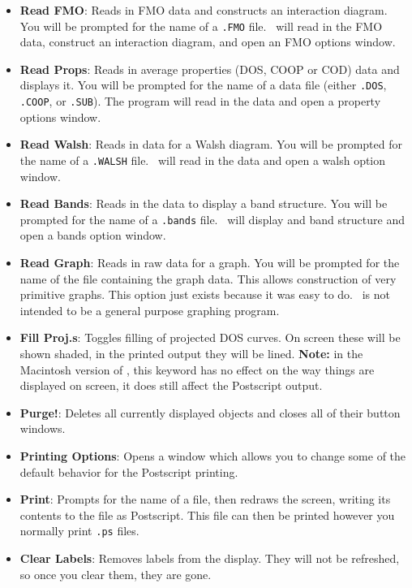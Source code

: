 \begin{itemize}
\item {\bf Read FMO}:  Reads in FMO data and constructs an interaction
diagram.  You will be prompted for the name of a {\tt .FMO} file.
\viewprog\ will read in the FMO data, construct an interaction
diagram, and open an FMO options window.

\item {\bf Read Props}:  Reads in average properties (DOS, COOP or
COD) data and displays it.  You will be prompted for the name of a
data file (either {\tt .DOS}, {\tt .COOP}, or {\tt .SUB}).  The
program will read in the data and open a property options window.

\item {\bf Read Walsh}:  Reads in data for a Walsh diagram.  You will
be prompted for the name of a {\tt .WALSH} file.  \viewprog\ will read
in the data and open a walsh option window.

\item {\bf Read Bands}:  Reads in the data to display a band
structure.  You will be prompted for the name of a {\tt .bands} file.
\viewprog\ will display and band structure and open a bands option
window.


\item {\bf Read Graph}:  Reads in raw data for a graph.  You will be
prompted for the name of the file containing the graph data.  This
allows construction of very primitive graphs.  This option just exists
because it was easy to do.  \viewprog\ is not intended to be a general
purpose graphing program.

\item {\bf Fill Proj.s}:  Toggles filling of projected DOS curves.  On
screen these will be shown shaded, in the printed output they will be
lined.  {\bf Note:} in the Macintosh version of \viewprog, this
keyword has no effect on the way things are displayed on screen, it
does still affect the Postscript output.

\item {\bf Purge!}: Deletes all currently displayed objects and closes
all of their button windows.

\item {\bf Printing Options}:  Opens a window which allows you to
change some of the default behavior for the Postscript printing.


\item {\bf Print}:  Prompts for the name of a file, then redraws the
screen, writing its contents to the file as Postscript.  This file can
then be printed however you normally print {\tt .ps} files.

\item {\bf Clear Labels}:  Removes labels from the display.  They
will not be refreshed, so once you clear them, they are gone.

\end{itemize}


